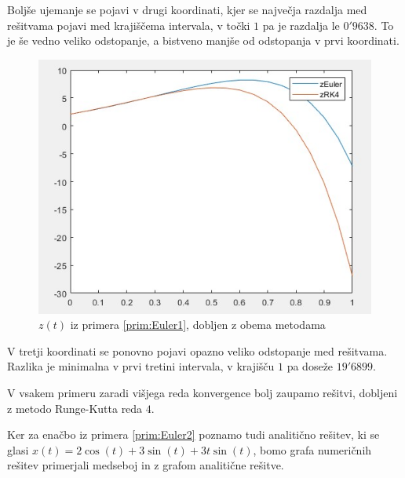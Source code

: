 \documentclass[a4paper, 10pt]{article}
\begin{document}
		Boljše ujemanje se pojavi v drugi koordinati, kjer se največja razdalja med rešitvama pojavi med krajiščema intervala, v točki $1$ pa je razdalja le $0'9638$. To je še vedno veliko odstopanje, a bistveno manjše od odstopanja v prvi koordinati.
		
		\begin{figure}[H]
			\centering
			\includegraphics[scale=0.75]{Prim1z.jpg}
			\caption{$z(t)$ iz primera \ref{prim:Euler1}, dobljen z obema metodama}
		\end{figure}
		
		V tretji koordinati se ponovno pojavi opazno veliko odstopanje med rešitvama. Razlika je minimalna v prvi tretini intervala, v krajišču $1$ pa doseže $19'6899$. 
		
		V vsakem primeru zaradi višjega reda konvergence bolj zaupamo rešitvi, dobljeni z metodo Runge-Kutta reda $4$. 
		
		Ker za enačbo iz primera \ref{prim:Euler2} poznamo tudi analitično rešitev, ki se glasi $x(t) = 2\cos(t) + 3\sin(t) + 3t\sin(t)$, bomo grafa numeričnih rešitev primerjali medseboj in z grafom analitične rešitve.
		
\end{document}
